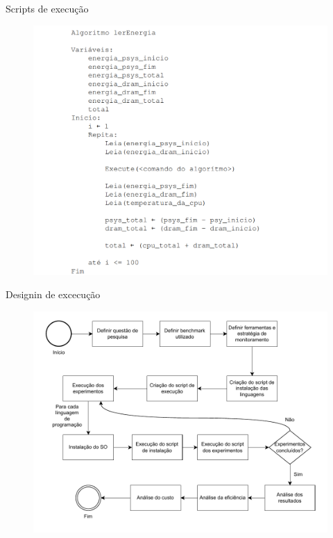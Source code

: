 \begin{frame}{Scripts de execução}
    \begin{figure}
        \centering
        \includegraphics[width=0.55\linewidth]{images/scriptMonitor.png}
    \end{figure}
\end{frame}

\begin{frame}{Designin de excecução }
    \begin{figure}
        \centering
        \includegraphics[width=0.65\linewidth]{images/fluxograma.pdf}
    \end{figure}
\end{frame}